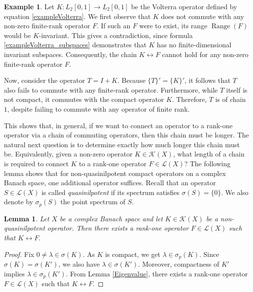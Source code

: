 \documentclass[a4paper,12pt]{article}
\newtheorem{lemma}[thm]{Lemma}
\theoremstyle{definition}
\newtheorem{example}[thm]{Example}
\numberwithin{equation}{section}
\numberwithin{thm}{section}
\begin{document}
\begin{example}
\label{Volterra2}
Let $K:L_2[0,1]\rightarrow L_2[0,1]$ be the Volterra operator defined by equation \eqref{exampleVolterra}. We first observe that $K$ does not commute with any non-zero finite-rank operator $F$. If such an $F$ were to exist, its range $\operatorname{Range}(F)$ would be $K$-invariant. This gives a contradiction, since formula \eqref{exampleVolterra_subspaces} demonstrates that $K$ has no finite-dimensional invariant subspaces. Consequently, the chain $K \leftrightarrow F$ cannot hold for any non-zero finite-rank operator $F$.

Now, consider the operator $T = I+K$. Because $\{T\}'=\{K\}'$, it follows that $T$ also fails to commute with any finite-rank operator. Furthermore, while $T$ itself is not compact, it commutes with the compact operator $K$. Therefore, $T$ is of chain $1$, despite failing to commute with any operator of finite rank.
\end{example}

This shows that, in general, if we want to connect an operator to a rank-one operator via a chain of commuting operators, then this chain must be longer. The natural next question is to determine exactly how much longer this chain must be. Equivalently, given a non-zero operator $K\in \mathcal{K}(X)$, what length of a chain is required to connect $K$ to a rank-one operator $F\in \mathcal{L}(X)$? The following lemma shows that for non-quasinilpotent compact operators on a complex Banach space, one additional operator suffices. Recall that an operator $S\in \mathcal{L}(X)$ is called \textit{quasinilpotent} if its spectrum satisfies $\sigma(S)=\{0\}$. We also denote by $\sigma_p(S)$ the point spectrum of $S$.

\begin{lemma}
\label{CompactFiniteRank}
Let $X$ be a complex Banach space and let $K\in \mathcal{K}(X)$ be a non-quasinilpotent operator. Then there exists a rank-one operator $F\in \mathcal{L}(X)$ such that $K \leftrightarrow F.$
\end{lemma}
\begin{proof}
Fix $0\neq \lambda \in \sigma(K)$. As $K$ is compact, we get $\lambda \in \sigma_p(K)$. Since $\sigma(K)=\sigma(K')$, we also have $\lambda \in \sigma(K')$. Moreover, compactness of $K'$ implies $\lambda \in \sigma_p(K')$. From Lemma \ref{Eigenvalue}, there exists a rank-one operator $F\in \mathcal{L}(X)$ such that $K \leftrightarrow F$.
\end{proof}
\end{document}
